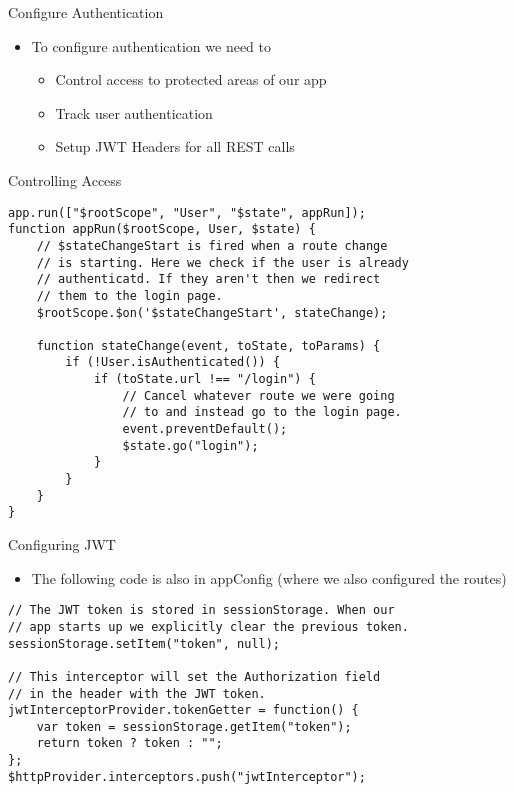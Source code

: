 \documentclass[presentation]{beamer}
\begin{document}
\begin{frame}[label=sec-3-4]{Configure Authentication}
\begin{itemize}
\item To configure authentication we need to
\begin{itemize}
\item Control access to protected areas of our app
\item Track user authentication
\item Setup JWT Headers for all REST calls
\end{itemize}
\end{itemize}
\end{frame}
\begin{frame}[fragile,shrink=10,label=sec-3-5]{Controlling Access}
 \begin{verbatim}
app.run(["$rootScope", "User", "$state", appRun]);
function appRun($rootScope, User, $state) {
    // $stateChangeStart is fired when a route change
    // is starting. Here we check if the user is already
    // authenticatd. If they aren't then we redirect
    // them to the login page.
    $rootScope.$on('$stateChangeStart', stateChange);

    function stateChange(event, toState, toParams) {
        if (!User.isAuthenticated()) {
            if (toState.url !== "/login") {
                // Cancel whatever route we were going
                // to and instead go to the login page.
                event.preventDefault();
                $state.go("login");
            }
        }
    }
}
\end{verbatim}
\end{frame}

\begin{frame}[fragile,shrink=10,label=sec-3-6]{Configuring JWT}
 \begin{itemize}
\item The following code is also in appConfig (where we also configured the routes)
\end{itemize}
\begin{verbatim}
// The JWT token is stored in sessionStorage. When our
// app starts up we explicitly clear the previous token.
sessionStorage.setItem("token", null);

// This interceptor will set the Authorization field
// in the header with the JWT token.
jwtInterceptorProvider.tokenGetter = function() {
    var token = sessionStorage.getItem("token");
    return token ? token : "";
};
$httpProvider.interceptors.push("jwtInterceptor");
\end{verbatim}
\end{frame}
\end{document}
